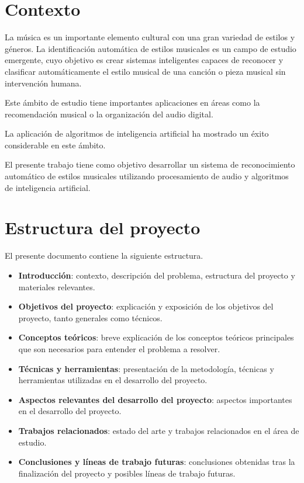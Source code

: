 
\section{Contexto}

La música es un importante elemento cultural con una gran variedad de estilos y géneros.
La identificación automática de estilos musicales es un campo de estudio emergente, cuyo objetivo es crear sistemas inteligentes capaces de reconocer y clasificar automáticamente el estilo musical de una canción o pieza musical sin intervención humana. 

Este ámbito de estudio tiene importantes aplicaciones en áreas como la recomendación musical o la organización del audio digital.

La aplicación de algoritmos de inteligencia artificial ha mostrado un éxito considerable en este ámbito.

El presente trabajo tiene como objetivo desarrollar un sistema de reconocimiento automático de estilos musicales utilizando procesamiento de audio y algoritmos de inteligencia artificial.

\section{Estructura del proyecto}
El presente documento contiene la siguiente estructura.

\begin{itemize}
\tightlist
\item \textbf{Introducción}: contexto, descripción del problema, estructura del proyecto y materiales relevantes.
\item \textbf{Objetivos del proyecto}: explicación y exposición de los objetivos del proyecto, tanto generales como técnicos.
\item \textbf{Conceptos teóricos}: breve explicación de los conceptos teóricos principales que son necesarios para entender el problema a resolver.
\item \textbf{Técnicas y herramientas}: presentación de la metodología, técnicas y herramientas utilizadas en el desarrollo del proyecto.
\item \textbf{Aspectos relevantes del desarrollo del proyecto}: aspectos importantes en el desarrollo del proyecto.
\item \textbf{Trabajos relacionados}: estado del arte y trabajos relacionados en el área de estudio.
\item \textbf{Conclusiones y líneas de trabajo futuras}: conclusiones obtenidas tras la finalización del proyecto y posibles líneas de trabajo futuras.
\end{itemize}

